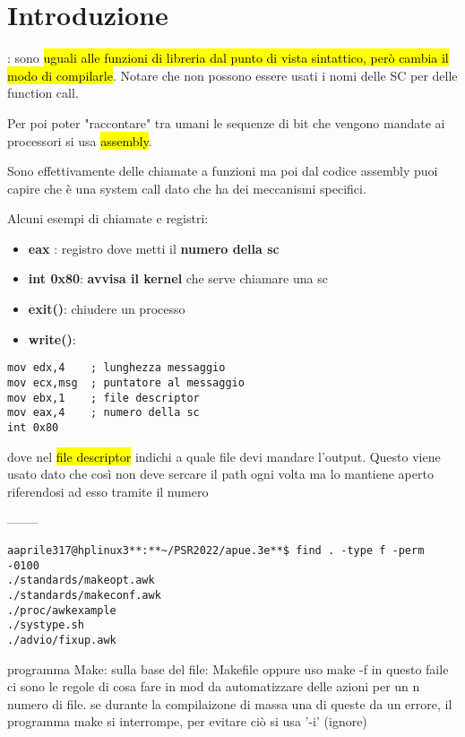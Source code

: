 
\section{Introduzione}

: sono \hl{uguali alle funzioni di libreria dal punto di vista sintattico, però cambia il modo di compilarle}. Notare che non possono essere usati i nomi delle SC per delle function call.

Per poi poter "raccontare" tra umani le sequenze di bit che vengono mandate ai processori si usa \hl{assembly}.

Sono effettivamente delle chiamate a funzioni ma poi dal codice assembly puoi capire che è una system call dato che ha dei meccanismi specifici.

Alcuni esempi di chiamate e registri:
\begin{itemize}
	\item \textbf{eax} : registro dove metti il \textbf{numero della sc}
	\item \textbf{int 0x80}: \textbf{avvisa il kernel} che serve chiamare una sc
	\item \textbf{exit()}: chiudere un processo
	\item \textbf{write()}:
\end{itemize}

\begin{lstlisting}
mov edx,4    ; lunghezza messaggio
mov ecx,msg  ; puntatore al messaggio
mov ebx,1    ; file descriptor
mov eax,4    ; numero della sc
int 0x80	
\end{lstlisting}

dove nel \hl{file descriptor} indichi a quale file devi mandare l'output. Questo viene usato dato che così non deve sercare il path ogni volta ma lo mantiene aperto riferendosi ad esso tramite il numero




--------
\begin{lstlisting}
aaprile317@hplinux3**:**~/PSR2022/apue.3e**$ find . -type f -perm -0100
./standards/makeopt.awk
./standards/makeconf.awk
./proc/awkexample
./systype.sh
./advio/fixup.awk
\end{lstlisting}

programma Make: sulla base del file: Makefile oppure uso make -f in questo faile ci sono le regole di cosa fare in mod da automatizzare delle azioni per un n numero di file. se durante la compilaizone di massa una di queste da un errore, il programma make si interrompe, per evitare ciò si usa '-i' (ignore)

